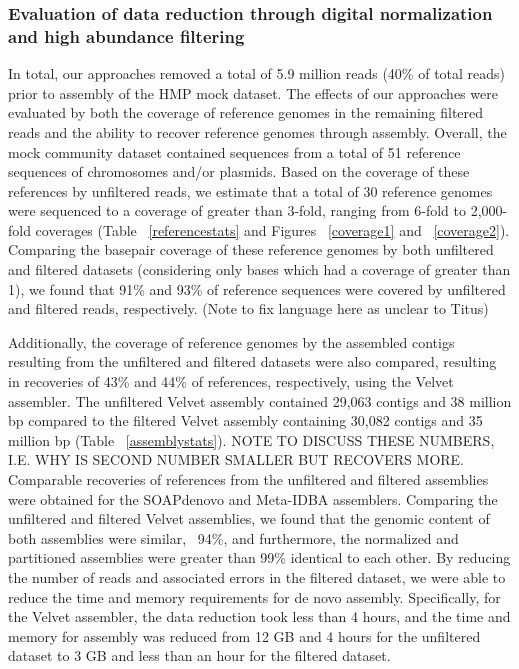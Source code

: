 \documentclass[11pt]{article} %
\begin{document}
\subsubsection{Evaluation of data reduction through digital normalization and high abundance filtering}

In total, our approaches removed a total of 5.9 million reads (40\% of total reads) prior to assembly of the HMP mock dataset.  The effects of our approaches were evaluated by both the coverage of reference genomes in the remaining filtered reads and the ability to recover reference genomes through assembly.  Overall, the mock community dataset contained sequences from a total of 51 reference sequences of chromosomes and/or plasmids.  Based on the coverage of these references by unfiltered reads, we estimate that a total of 30 reference genomes were sequenced to a coverage of greater than 3-fold, ranging from 6-fold to 2,000-fold coverages (Table ~\ref{referencestats} and Figures ~\ref{coverage1} and ~\ref{coverage2}).  Comparing the basepair coverage of these reference genomes by both unfiltered and filtered datasets (considering only bases which had a coverage of greater than 1), we found that 91\% and 93\% of reference sequences were covered by unfiltered and filtered reads, respectively.  (Note to fix language here as unclear to Titus) 

Additionally, the coverage of reference genomes by the assembled contigs resulting from the unfiltered and filtered datasets were also compared, resulting in recoveries of 43\% and 44\% of references, respectively, using the Velvet assembler.  The unfiltered Velvet assembly contained 29,063 contigs and 38 million bp compared to the filtered Velvet assembly containing 30,082 contigs and 35 million bp (Table ~\ref{assemblystats}).  NOTE TO DISCUSS THESE NUMBERS, I.E. WHY IS SECOND NUMBER SMALLER BUT RECOVERS MORE.  Comparable recoveries of references from the unfiltered and filtered assemblies were obtained for the SOAPdenovo and Meta-IDBA assemblers.   Comparing the unfiltered and filtered Velvet assemblies, we found that the genomic content of both assemblies were similar, ~94\%, and furthermore, the normalized and partitioned assemblies were greater than 99\% identical to each other.  By reducing the number of reads and associated errors in the filtered dataset, we were able to reduce the time and memory requirements for de novo assembly.  Specifically, for the Velvet assembler, the data reduction took less than 4 hours, and the time and memory for assembly was reduced from 12 GB and 4 hours for the unfiltered dataset to 3 GB and less than an hour for the filtered dataset.   
\end{document}
